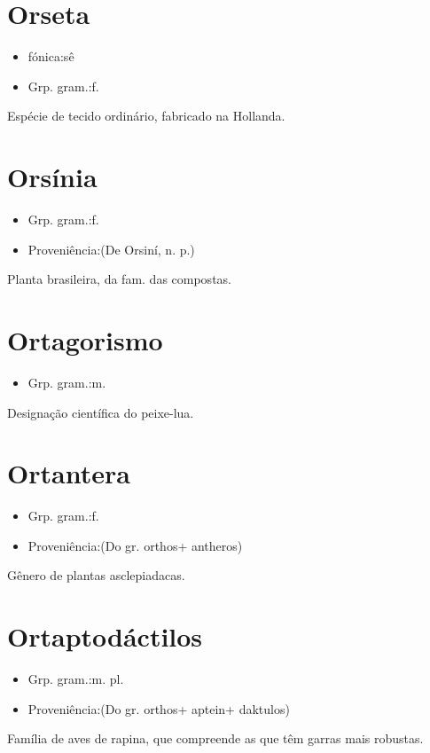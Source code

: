 \section{Orseta}
\begin{itemize}
\item {fónica:sê}
\end{itemize}
\begin{itemize}
\item {Grp. gram.:f.}
\end{itemize}
Espécie de tecido ordinário, fabricado na Hollanda.
\section{Orsínia}
\begin{itemize}
\item {Grp. gram.:f.}
\end{itemize}
\begin{itemize}
\item {Proveniência:(De \textunderscore Orsiní\textunderscore , n. p.)}
\end{itemize}
Planta brasileira, da fam. das compostas.
\section{Ortagorismo}
\begin{itemize}
\item {Grp. gram.:m.}
\end{itemize}
Designação científica do peixe-lua.
\section{Ortantera}
\begin{itemize}
\item {Grp. gram.:f.}
\end{itemize}
\begin{itemize}
\item {Proveniência:(Do gr. \textunderscore orthos\textunderscore  + \textunderscore antheros\textunderscore )}
\end{itemize}
Gênero de plantas asclepiadacas.
\section{Ortaptodáctilos}
\begin{itemize}
\item {Grp. gram.:m. pl.}
\end{itemize}
\begin{itemize}
\item {Proveniência:(Do gr. \textunderscore orthos\textunderscore  + \textunderscore aptein\textunderscore  + \textunderscore daktulos\textunderscore )}
\end{itemize}
Família de aves de rapina, que compreende as que têm garras mais robustas.
